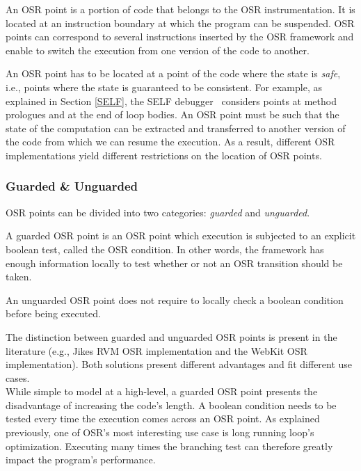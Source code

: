 \begin{definition}\label{OSRPointDefinition}
An OSR point is a portion of code that belongs to the OSR instrumentation.
It is located at an instruction boundary at which the program can be suspended.
OSR points can correspond to several instructions inserted by the OSR framework and enable to switch the execution from one version of the code to another.
\end{definition}

An OSR point has to be located at a point of the code where the state is \textit{safe}, i.e., points where the state is guaranteed to be consistent.
For example, as explained in Section \ref{SELF}, the SELF debugger~\cite{holzle1992debugging} considers points at method prologues and at the end of loop bodies.
An OSR point must be such that the state of the computation can be extracted and transferred to another version of the code from which we can resume the execution.
As a result, different OSR implementations yield different restrictions on the location of OSR points.\\

\subsubsection{Guarded \& Unguarded}

OSR points can be divided into two categories: \textit{guarded} and \textit{unguarded}.
\begin{definition}
A guarded OSR point is an OSR point which execution is subjected to an explicit boolean test, called the OSR condition.
In other words, the framework has enough information locally to test whether or not an OSR transition should be taken.
\end{definition}
\begin{definition}
An unguarded OSR point does not require to locally check a boolean condition before being executed. 
\end{definition}
The distinction between guarded and unguarded OSR points is present in the literature (e.g., Jikes RVM OSR implementation\cite{fink2003design, soman2006efficient} and the WebKit OSR implementation\cite{WebKitURL}).
Both solutions present different advantages and fit different use cases.\\

While simple to model at a high-level, a guarded OSR point presents the disadvantage of increasing the code's length. 
A boolean condition needs to be tested every time the execution comes across an OSR point.
As explained previously, one of OSR's most interesting use case is long running loop's optimization.
Executing many times the branching test can therefore greatly impact the program's performance.\\

